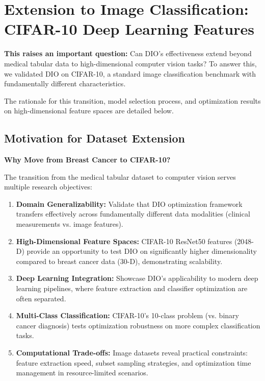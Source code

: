 \documentclass[12pt, a4paper]{article}
\begin{document}
\section{Extension to Image Classification: CIFAR-10 Deep Learning Features}

\textbf{This raises an important question:} Can DIO's effectiveness extend beyond medical tabular data to high-dimensional computer vision tasks? To answer this, we validated DIO on CIFAR-10, a standard image classification benchmark with fundamentally different characteristics.

The rationale for this transition, model selection process, and optimization results on high-dimensional feature spaces are detailed below.

\subsection{Motivation for Dataset Extension}

\textbf{Why Move from Breast Cancer to CIFAR-10?}

The transition from the medical tabular dataset to computer vision serves multiple research objectives:

\begin{enumerate}
    \item \textbf{Domain Generalizability:} Validate that DIO optimization framework transfers effectively across fundamentally different data modalities (clinical measurements vs. image features).
    
    \item \textbf{High-Dimensional Feature Spaces:} CIFAR-10 ResNet50 features (2048-D) provide an opportunity to test DIO on significantly higher dimensionality compared to breast cancer data (30-D), demonstrating scalability.
    
    \item \textbf{Deep Learning Integration:} Showcase DIO's applicability to modern deep learning pipelines, where feature extraction and classifier optimization are often separated.
    
    \item \textbf{Multi-Class Classification:} CIFAR-10's 10-class problem (vs. binary cancer diagnosis) tests optimization robustness on more complex classification tasks.
    
    \item \textbf{Computational Trade-offs:} Image datasets reveal practical constraints: feature extraction speed, subset sampling strategies, and optimization time management in resource-limited scenarios.
\end{enumerate}
\end{document}
